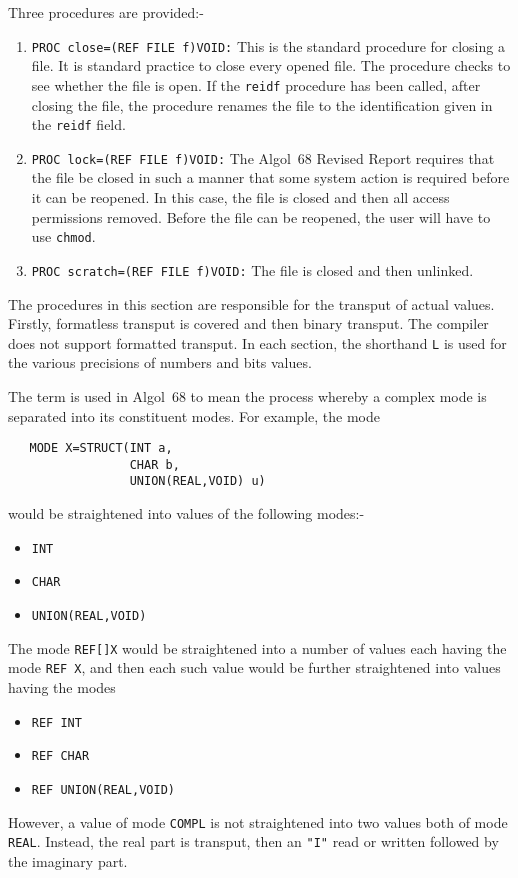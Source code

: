 \pagebreak
{}
Three procedures are provided:-
\begin{enumerate}
\item \verb|PROC close=(REF FILE f)VOID:|\newline
This is the standard procedure for closing a file. It is standard
practice to close every opened file. The procedure checks to see
whether the file is open. If the \verb|reidf| procedure has been
called, after closing the file, the procedure renames the file to the
identification given in the \verb|reidf| field.
\item \verb|PROC lock=(REF FILE f)VOID:|\newline
The Algol~68 Revised Report requires that the file be closed in such a
manner that some system action is required before it can be reopened.
In this case, the file is closed and then all access permissions
removed. Before the file can be reopened, the user will have to use
\verb|chmod|.
\item \verb|PROC scratch=(REF FILE f)VOID:|\newline
The file is closed and then unlinked.
\end{enumerate}

The procedures in this section are responsible for the trans\-put of
actual values. Firstly, formatless transput is covered and then binary
transput. The  compiler does not support formatted
transput. In each section, the shorthand \verb|L| is used for the
various precisions of numbers and bits values.

The term  is used in Algol~68 to mean the process
whereby a complex mode is separated into its constituent modes. For
example, the mode
\begin{verbatim}
   MODE X=STRUCT(INT a,
                 CHAR b,
                 UNION(REAL,VOID) u)
\end{verbatim}
\noindent
would be straightened into values of the following modes:-
\begin{itemize}
\item \verb|INT|
\item \verb|CHAR|
\item \verb|UNION(REAL,VOID)|
\end{itemize}
The mode \verb|REF[]X| would be straightened into a number of values
each having the mode \verb|REF X|, and then each such value would be
further straightened into values having the modes
\begin{itemize}
\item \verb|REF INT|
\item \verb|REF CHAR|
\item \verb|REF UNION(REAL,VOID)|
\end{itemize}
However, a value of mode \verb|COMPL| is not straightened into two
values both of mode \verb|REAL|. Instead, the real part is transput,
then an \verb|"I"| read or written followed by the imaginary part.

